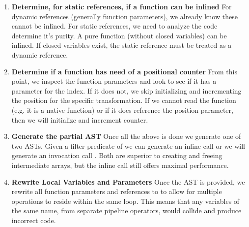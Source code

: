 \begin{enumerate}
  \item \textbf{Determine, for static references, if a function can be inlined}
    For dynamic references (generally  function parameters), we already know these cannot be inlined.  For static references, we need to analyze the code determine it's purity.  A pure function (without closed variables) can be inlined.  If closed variables exist, the static reference must be treated as a dynamic reference.
  \item \textbf{Determine if a function has need of a positional counter}
    From this point, we inspect the function parameters and look to see if it has a parameter for the index.  If it does not, we skip initializing and incrementing the position for the specific transformation.  If we cannot read the function (e.g. it is a native function) or if it does reference the position parameter, then we will initialize and increment counter.
  \item \textbf{Generate the partial AST}
    Once all the above is done we generate one of two ASTs. Given a filter predicate of  we can generate an inline call  or we will generate an invocation call .  Both are superior to creating and freeing intermediate arrays, but the inline call still offers maximal performance.
  \item \textbf{Rewrite Local Variables and Parameters}
    Once the AST is provided, we rewrite all function parameters and references to  to allow for multiple operations to reside within the same  loop.  This means that any variables of the same name, from separate pipeline operators, would collide and produce incorrect code.  
\end{enumerate}
